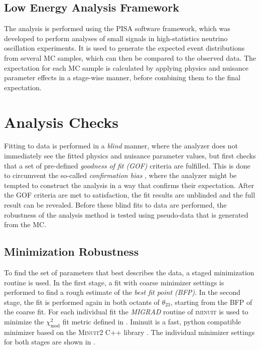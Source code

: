 \subsection{Low Energy Analysis Framework} 

The analysis is performed using the \textsc{PISA}  \cite{pisa_software} software framework, which was developed to perform analyses of small signals in high-statistics neutrino oscillation experiments. It is used to generate the expected event distributions from several MC samples, which can then be compared to the observed data. The expectation for each MC sample is calculated by applying physics and nuisance parameter effects in a stage-wise manner, before combining them to the final expectation.


\section{Analysis Checks}

Fitting to data is performed in a \textit{blind} manner, where the analyzer does not immediately see the fitted physics and nuisance parameter values, but first checks that a set of pre-defined \textit{goodness of fit (GOF)} criteria are fulfilled.
This is done to circumvent the so-called \textit{confirmation bias} , where the analyzer might be tempted to construct the analysis in a way that confirms their expectation. After the GOF criteria are met to satisfaction, the fit results are unblinded and the full result can be revealed. Before these blind fits to data are performed, the robustness of the analysis method is tested using pseudo-data that is generated from the MC.


\subsection{Minimization Robustness} 

To find the set of parameters that best describes the data, a staged minimization routine is used. In the first stage, a fit with coarse minimizer settings is performed to find a rough estimate of the \textit{best fit point (BFP)}. In the second stage, the fit is performed again in both octants of $\theta_{23}$, starting from the BFP of the coarse fit. For each individual fit the \textit{MIGRAD} routine of \textsc{iminuit}  is used to minimize the $\chi^2_{\mathrm{mod}}$ fit metric defined in . Iminuit is a fast, python compatible minimizer based on the \textsc{Minuit2} C++ library . The individual minimizer settings for both stages are shown in .

